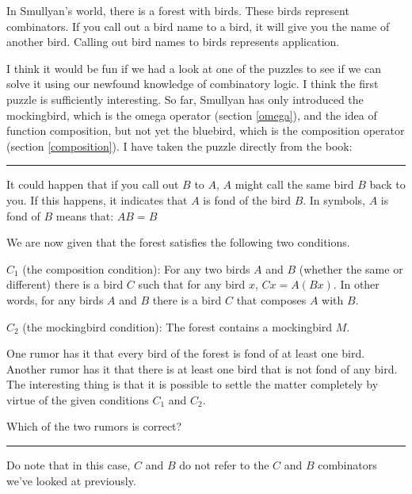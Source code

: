 \documentclass[11pt]{article}
\begin{document}
In Smullyan's world, there is a forest with birds. These birds represent
combinators. If you call out a bird name to a bird, it will give you the name
of another bird. Calling out bird names to birds represents application.

I think it would be fun if we had a look at one of the puzzles to see if we can
solve it using our newfound knowledge of combinatory logic. I think the first
puzzle is sufficiently interesting. So far, Smullyan has only introduced the
mockingbird, which is the omega operator (section \ref{omega}), and the idea of
function composition, but not yet the bluebird, which is the composition
operator (section \ref{composition}). I have taken the puzzle directly from the
book:

\setlength{\leftskip}{1cm}
\setlength{\rightskip}{1cm}
\begin{center}
\rule{15cm}{0.5pt}
\end{center}

It could happen that if you call out \(B\) to \(A\), \(A\) might call the same
bird \(B\) back to you. If this happens, it indicates that \(A\) is fond of the
bird \(B\). In symbols, \(A\) is fond of \(B\) means that: \(AB = B\)

We are now given that the forest satisfies the following two conditions. 

\(C_{1}\) (the composition condition): For any two birds \(A\) and \(B\)
(whether the same or different) there is a bird \(C\) such that for any bird
\(x\), \(Cx = A(Bx)\). In other words, for any birds \(A\) and \(B\) there is a
bird \(C\) that composes \(A\) with \(B\). 

\(C_{2}\) (the mockingbird condition): The forest contains a mockingbird \(M\). 

One rumor has it that every bird of the forest is fond of at least one bird.
Another rumor has it that there is at least one bird that is not fond of any
bird. The interesting thing is that it is possible to settle the matter
completely by virtue of the given conditions \(C_{1}\) and \(C_{2}\).

Which of the two rumors is correct? 

\begin{center}
\rule{15cm}{0.5pt}
\end{center}
\setlength{\leftskip}{0pt}
\setlength{\rightskip}{0pt}

Do note that in this case, \(C\) and \(B\) do not refer to the \(C\) and \(B\)
combinators we've looked at previously.
\end{document}
